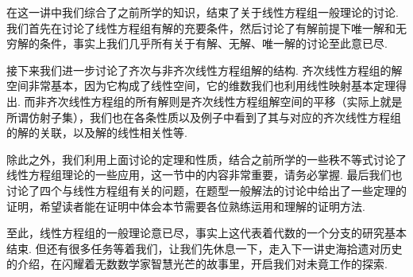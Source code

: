 \begin{summary}

    在这一讲中我们综合了之前所学的知识，结束了关于线性方程组一般理论的讨论. 我们首先在讨论了线性方程组有解的充要条件，然后讨论了有解前提下唯一解和无穷解的条件，事实上我们几乎所有关于有解、无解、唯一解的讨论至此意已尽.

    接下来我们进一步讨论了齐次与非齐次线性方程组解的结构. 齐次线性方程组的解空间非常基本，因为它构成了线性空间，它的维数我们也利用线性映射基本定理得出. 而非齐次线性方程组的所有解则是齐次线性方程组解空间的平移（实际上就是所谓仿射子集），我们也在各条性质以及例子中看到了其与对应的齐次线性方程组的解的关联，以及解的线性相关性等.

    除此之外，我们利用上面讨论的定理和性质，结合之前所学的一些秩不等式讨论了线性方程组理论的一些应用，这一节中的内容非常重要，请务必掌握. 最后我们也讨论了四个与线性方程组有关的问题，在题型一般解法的讨论中给出了一些定理的证明，希望读者能在证明中体会本节需要各位熟练运用和理解的证明方法.

    至此，线性方程组的一般理论意已尽，事实上这代表着代数的一个分支的研究基本结束. 但还有很多任务等着我们，让我们先休息一下，走入下一讲史海拾遗对历史的介绍，在闪耀着无数数学家智慧光芒的故事里，开启我们对未竟工作的探索.

\end{summary}

